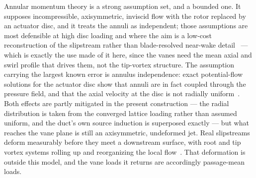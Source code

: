 \documentclass[]{aiaa-tc}%
\begin{document}
Annular momentum theory is a strong assumption set, and a bounded
one. It supposes incompressible, axisymmetric, inviscid flow with the
rotor replaced by an actuator disc, and it treats the annuli as
independent; those assumptions are most defensible at high disc
loading and where the aim is a low-cost reconstruction of the
slipstream rather than blade-resolved near-wake
detail~\cite{bontempoManna2013,vanDerWall2024} --- which is exactly
the use made of it here, since the vanes need the mean axial and
swirl profile that drives them, not the tip-vortex structure. The
assumption carrying the largest known error is annulus independence:
exact potential-flow solutions for the actuator disc show that annuli
are in fact coupled through the pressure field, and that the axial
velocity at the disc is not radially
uniform~\cite{kuikLignarolo2016,bontempoManna2013}. Both effects are
partly mitigated in the present construction --- the radial
distribution is taken from the converged lattice loading rather than
assumed uniform, and the duct's own source induction is superposed
exactly --- but what reaches the vane plane is still an axisymmetric,
undeformed jet. Real slipstreams deform measurably before they meet a
downstream surface, with root and tip vortex systems rolling up and
reorganizing the local flow~\cite{duivenvoorden2025}. That
deformation is outside this model, and the vane loads it returns are
accordingly passage-mean loads.
\end{document}
